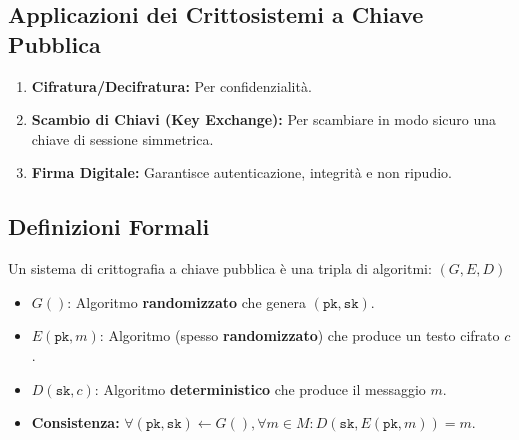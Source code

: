 \subsection{Applicazioni dei Crittosistemi a Chiave Pubblica}
\begin{enumerate}
    \item \textbf{Cifratura/Decifratura:} Per confidenzialità.
    \item \textbf{Scambio di Chiavi (Key Exchange):} Per scambiare in modo sicuro una chiave di sessione simmetrica.
    \item \textbf{Firma Digitale:} Garantisce autenticazione, integrità e non ripudio.
\end{enumerate}

\subsection{Definizioni Formali}
Un sistema di crittografia a chiave pubblica è una tripla di algoritmi: $(G, E, D)$
\begin{itemize}
    \item $G()$: Algoritmo \textbf{randomizzato} che genera $(\texttt{pk}, \texttt{sk})$.
    \item $E(\texttt{pk}, m)$: Algoritmo (spesso \textbf{randomizzato}) che produce un testo cifrato $c$.
    \item $D(\texttt{sk}, c)$: Algoritmo \textbf{deterministico} che produce il messaggio $m$.
    \item \textbf{Consistenza:} $\forall (\texttt{pk}, \texttt{sk}) \leftarrow G(), \forall m \in M: D(\texttt{sk}, E(\texttt{pk}, m)) = m$.
\end{itemize}

